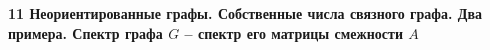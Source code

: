 \bf{11} Неориентированные графы. Собственные числа связного графа. Два примера.
 Спектр графа $G$ -- спектр его матрицы смежности $A$
\edfn